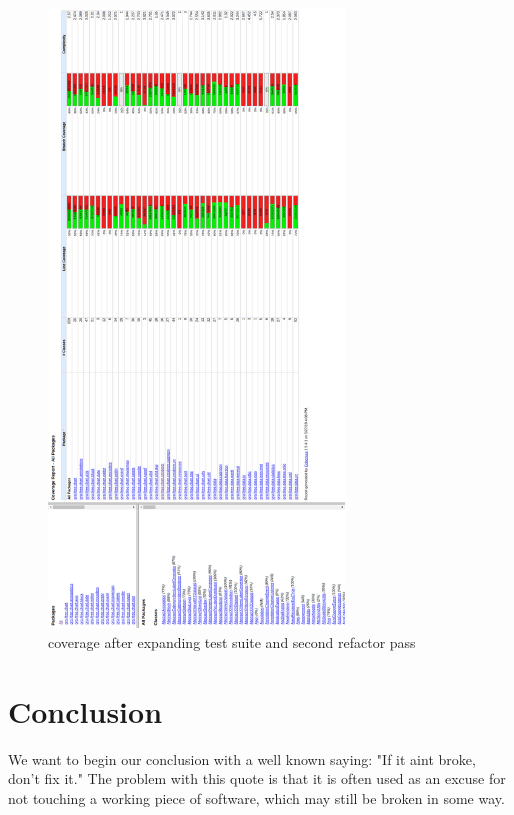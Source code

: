 \documentclass{article}
\begin{document}
\newpage
\begin{figure}[H]
\centering
	\includegraphics[width=0.7\textwidth]{coverage/AFTER_SPASS.png}
	\caption{coverage after expanding test suite and second refactor pass}
\end{figure}


\newpage
\section{Conclusion}

We want to begin our conclusion with a well known saying: "If it aint broke, don't fix it." The problem with this quote is that it is often used as an excuse for not touching a working piece of software, which may still be broken in some way.\cite{mps}\\ 
\end{document}
